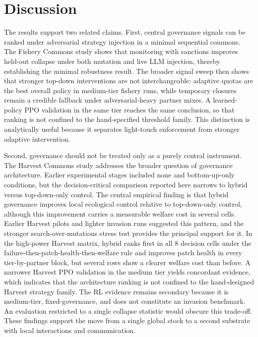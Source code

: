 \section{Discussion}

The results support two related claims. First, central governance signals can be ranked under adversarial strategy injection in a minimal sequential commons. The Fishery Commons study shows that monitoring with sanctions improves held-out collapse under both mutation and live LLM injection, thereby establishing the minimal robustness result. The broader signal sweep then shows that stronger top-down interventions are not interchangeable: adaptive quotas are the best overall policy in medium-tier fishery runs, while temporary closures remain a credible fallback under adversarial-heavy partner mixes. A learned-policy PPO validation in the same tier reaches the same conclusion, so that ranking is not confined to the hand-specified threshold family. This distinction is analytically useful because it separates light-touch enforcement from stronger adaptive intervention.

Second, governance should not be treated only as a purely central instrument. The Harvest Commons study addresses the broader question of governance architecture. Earlier experimental stages included none and bottom-up-only conditions, but the decision-critical comparison reported here narrows to hybrid versus top-down-only control. The central empirical finding is that hybrid governance improves local ecological control relative to top-down-only control, although this improvement carries a measurable welfare cost in several cells. Earlier Harvest pilots and lighter invasion runs suggested this pattern, and the stronger search-over-mutations stress test provides the principal support for it. In the high-power Harvest matrix, hybrid ranks first in all 8 decision cells under the failure-then-patch-health-then-welfare rule and improves patch health in every tier-by-partner block, but several rows show a clearer welfare cost than before. A narrower Harvest PPO validation in the medium tier yields concordant evidence, which indicates that the architecture ranking is not confined to the hand-designed Harvest strategy family. The RL evidence remains secondary because it is medium-tier, fixed-governance, and does not constitute an invasion benchmark. An evaluation restricted to a single collapse statistic would obscure this trade-off. These findings support the move from a single global stock to a second substrate with local interactions and communication.

